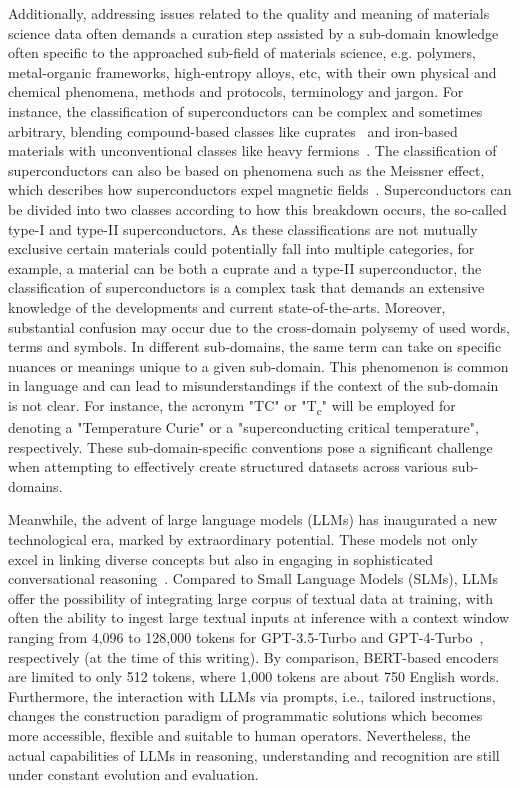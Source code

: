 Additionally, addressing issues related to the quality and meaning of materials science data often demands a curation step assisted by a sub-domain knowledge often specific to the approached sub-field of materials science, e.g. polymers, metal-organic frameworks, high-entropy alloys, etc, with their own physical and chemical phenomena, methods and protocols, terminology and jargon. For instance, the classification of superconductors can be complex and sometimes arbitrary, blending compound-based classes like cuprates~\cite{parinov2013microstructure} and iron-based~\cite{hosono2015exploration} materials with unconventional classes like heavy fermions~\cite{mydeen2020electron}. The classification of superconductors can also be based on phenomena such as the Meissner effect, which describes how superconductors expel magnetic fields~\cite{bardeen1957theory}. Superconductors can be divided into two classes according to how this breakdown occurs, the so-called type-I and type-II superconductors. As these classifications are not mutually exclusive certain materials could potentially fall into multiple categories, for example, a material can be both a cuprate and a type-II superconductor, the classification of superconductors is a complex task that demands an extensive knowledge of the developments and current state-of-the-arts. Moreover, substantial confusion may occur due to the cross-domain polysemy of used words, terms and symbols. In different sub-domains, the same term can take on specific nuances or meanings unique to a given sub-domain. This phenomenon is common in language and can lead to misunderstandings if the context of the sub-domain is not clear. For instance, the acronym "TC" or "T\textsubscript{c}" will be employed for denoting a "Temperature Curie" or a "superconducting critical temperature", respectively. These sub-domain-specific conventions pose a significant challenge when attempting to effectively create structured datasets across various sub-domains.

Meanwhile, the advent of large language models (LLMs) has inaugurated a new technological era, marked by extraordinary potential. These models not only excel in linking diverse concepts but also in engaging in sophisticated conversational reasoning~\cite{zhang2023one,yao2023tree,valmeekam2023planning,sun2023pearl}. Compared to Small Language Models (SLMs), LLMs offer the possibility of integrating large corpus of textual data at training, with often the ability to ingest large textual inputs at inference with a context window ranging from 4,096 to 128,000 tokens for GPT-3.5-Turbo and GPT-4-Turbo~\cite{OpenAIDocJan2024}, respectively (at the time of this writing). By comparison, BERT-based encoders are limited to only 512 tokens, where 1,000 tokens are about 750 English words. Furthermore, the interaction with LLMs via prompts, i.e., tailored instructions, changes the construction paradigm of programmatic solutions which becomes more accessible, flexible and suitable to human operators. Nevertheless, the actual capabilities of LLMs in reasoning, understanding and recognition are still under constant evolution and evaluation. 

